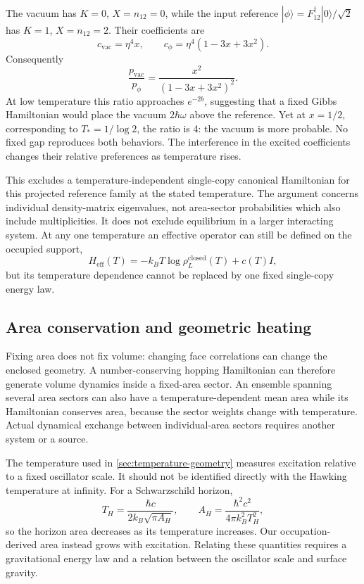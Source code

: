 \documentclass[twocolumn,draft,aps,nofootinbib,nobibnotes,final]{revtex4-2}
\begin{document}
The vacuum has $K=0$, $X=n_{12}=0$, while the input reference $|\phi\rangle=F_{12}^{\dagger}|0\rangle/\sqrt2$ has $K=1$, $X=n_{12}=2$. Their coefficients are
\begin{equation}
 c_{\mathrm{vac}}=\eta^4x,\qquad
 c_\phi=\eta^4(1-3x+3x^2).
\end{equation}
Consequently
\begin{equation}\label{eqn:vacuum-reference-gibbs-test}
 \frac{p_{\mathrm{vac}}}{p_\phi}
 =\frac{x^2}{(1-3x+3x^2)^2}.
\end{equation}
At low temperature this ratio approaches $e^{-2b}$, suggesting that a fixed Gibbs Hamiltonian would place the vacuum $2\hbar\omega$ above the reference. Yet at $x=1/2$, corresponding to $T_*=1/\log2$, the ratio is 4: the vacuum is more probable. No fixed gap reproduces both behaviors. The interference in the excited coefficients changes their relative preferences as temperature rises.

This excludes a temperature-independent single-copy canonical Hamiltonian for this projected reference family at the stated temperature. The argument concerns individual density-matrix eigenvalues, not area-sector probabilities which also include multiplicities. It does not exclude equilibrium in a larger interacting system. At any one temperature an effective operator can still be defined on the occupied support,
\begin{equation}
 H_{\mathrm{eff}}(T)=-k_BT\log\rho_L^{\mathrm{closed}}(T)+c(T)I,
\end{equation}
but its temperature dependence cannot be replaced by one fixed single-copy energy law.

\subsection{Area conservation and geometric heating}

Fixing area does not fix volume: changing face correlations can change the enclosed geometry. A number-conserving hopping Hamiltonian can therefore generate volume dynamics inside a fixed-area sector. An ensemble spanning several area sectors can also have a temperature-dependent mean area while its Hamiltonian conserves area, because the sector weights change with temperature. Actual dynamical exchange between individual-area sectors requires another system or a source.

The temperature used in \autoref{sec:temperature-geometry} measures excitation relative to a fixed oscillator scale. It should not be identified directly with the Hawking temperature at infinity. For a Schwarzschild horizon,
\begin{equation}
 T_H=\frac{\hbar c}{2k_B\sqrt{\pi A_H}},\qquad
 A_H=\frac{\hbar^2c^2}{4\pi k_B^2T_H^2},
\end{equation}
so the horizon area decreases as its temperature increases. Our occupation-derived area instead grows with excitation. Relating these quantities requires a gravitational energy law and a relation between the oscillator scale and surface gravity.
\end{document}
